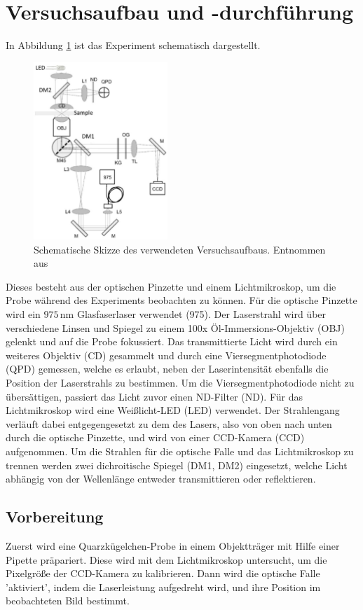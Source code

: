 \newpage
\section{Versuchsaufbau und -durchführung}
  In Abbildung \ref{fig:Aufbau} ist das Experiment schematisch dargestellt.
  \begin{figure}[h]
    \centering
    \includegraphics[width = 0.45\textwidth]{pictures/OPaufbau.png}
    \caption{Schematische Skizze des verwendeten Versuchsaufbaus. Entnommen aus \cite{tu_dortmund_versuchsanleitung_OptischePinzette}}
    \label{fig:Aufbau}
  \end{figure}
  Dieses besteht aus der optischen Pinzette und einem Lichtmikroskop, um die Probe während des Experiments beobachten zu können.
  Für die optische Pinzette wird ein $975\,\text{nm}$ Glasfaserlaser verwendet (975). Der Laserstrahl wird über verschiedene Linsen und Spiegel zu einem 100x Öl-Immersions-Objektiv (OBJ) gelenkt und auf die Probe fokussiert. Das transmittierte Licht wird durch ein weiteres Objektiv (CD) gesammelt und durch eine Viersegmentphotodiode (QPD) gemessen, welche es erlaubt, neben der Laserintensität ebenfalls die Position der Laserstrahls zu bestimmen. Um die Viersegmentphotodiode nicht zu übersättigen, passiert das Licht zuvor einen ND-Filter (ND).
  Für das Lichtmikroskop wird eine Weißlicht-LED (LED) verwendet. Der Strahlengang verläuft dabei entgegengesetzt zu dem des Lasers, also von oben nach unten durch die optische Pinzette, und wird von einer CCD-Kamera (CCD) aufgenommen.
  Um die Strahlen für die optische Falle und das Lichtmikroskop zu trennen werden zwei dichroitische Spiegel (DM1, DM2) eingesetzt, welche Licht abhängig von der Wellenlänge entweder transmittieren oder reflektieren.
  \subsection{Vorbereitung}
    Zuerst wird eine Quarzkügelchen-Probe in einem Objektträger mit Hilfe einer Pipette präpariert. Diese wird mit dem Lichtmikroskop untersucht, um die Pixelgröße der CCD-Kamera zu kalibrieren. Dann wird die optische Falle 'aktiviert', indem die Laserleistung aufgedreht wird, und ihre Position im beobachteten Bild bestimmt.
